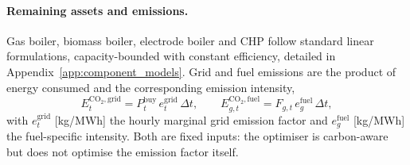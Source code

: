 \paragraph{Remaining assets and emissions.}
Gas boiler, biomass boiler, electrode boiler and CHP follow standard linear formulations,
capacity-bounded with constant efficiency, detailed in
Appendix~\ref{app:component_models}. Grid and fuel emissions are the product of energy
consumed and the corresponding emission intensity,
%
\begin{equation}
  E_t^{\mathrm{CO_2,grid}} =
    P_t^{\mathrm{buy}}\, e_t^{\mathrm{grid}}\, \Delta t,
  \qquad
  E_{g,t}^{\mathrm{CO_2,fuel}} =
    F_{g,t}\, e_g^{\mathrm{fuel}}\, \Delta t,
  \label{eq:emissions}
\end{equation}
%
with $e_t^{\mathrm{grid}}$ [kg/MWh] the hourly marginal grid emission factor and
$e_g^{\mathrm{fuel}}$ [kg/MWh] the fuel-specific intensity. Both are fixed inputs: the
optimiser is carbon-aware but does not optimise the emission factor itself.
